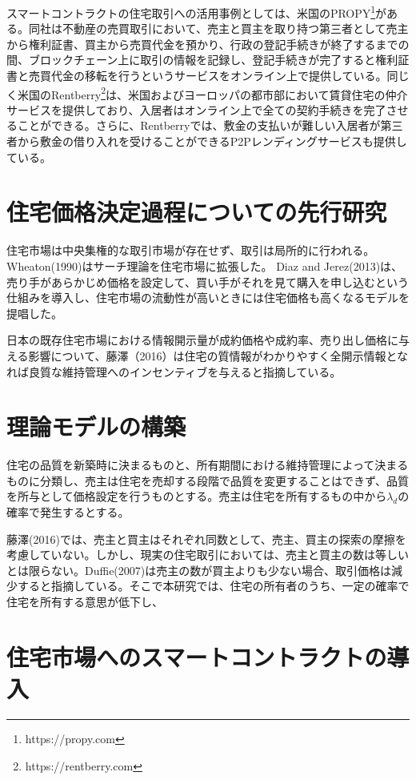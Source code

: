 \documentclass[a4paper,11pt]{jlreq}
\begin{document}
スマートコントラクトの住宅取引への活用事例としては、米国のPROPY\footnote{https://propy.com}がある。同社は不動産の売買取引において、売主と買主を取り持つ第三者として売主から権利証書、買主から売買代金を預かり、行政の登記手続きが終了するまでの間、ブロックチェーン上に取引の情報を記録し、登記手続きが完了すると権利証書と売買代金の移転を行うというサービスをオンライン上で提供している。同じく米国のRentberry\footnote{https://rentberry.com}は、米国およびヨーロッパの都市部において賃貸住宅の仲介サービスを提供しており、入居者はオンライン上で全ての契約手続きを完了させることができる。さらに、Rentberryでは、敷金の支払いが難しい入居者が第三者から敷金の借り入れを受けることができるP2Pレンディングサービスも提供している。


\section{住宅価格決定過程についての先行研究}
住宅市場は中央集権的な取引市場が存在せず、取引は局所的に行われる。
Wheaton(1990)はサーチ理論を住宅市場に拡張した。
Diaz and Jerez(2013)は、売り手があらかじめ価格を設定して、買い手がそれを見て購入を申し込むという仕組みを導入し、住宅市場の流動性が高いときには住宅価格も高くなるモデルを提唱した。

日本の既存住宅市場における情報開示量が成約価格や成約率、売り出し価格に与える影響について、藤澤（2016）は住宅の質情報がわかりやすく全開示情報となれば良質な維持管理へのインセンティブを与えると指摘している。
\section{理論モデルの構築}
住宅の品質を新築時に決まるものと、所有期間における維持管理によって決まるものに分類し、売主は住宅を売却する段階で品質を変更することはできず、品質を所与として価格設定を行うものとする。売主は住宅を所有するもの中から$\lambda_{d}$の確率で発生するとする。

藤澤(2016)では、売主と買主はそれぞれ同数として、売主、買主の探索の摩擦を考慮していない。しかし、現実の住宅取引においては、売主と買主の数は等しいとは限らない。Duffie(2007)は売主の数が買主よりも少ない場合、取引価格は減少すると指摘している。そこで本研究では、住宅の所有者のうち、一定の確率で住宅を所有する意思が低下し、

\section{住宅市場へのスマートコントラクトの導入}
\end{document}
